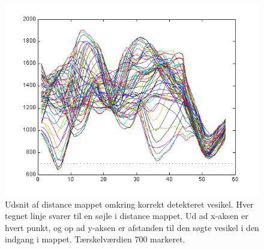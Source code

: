 \begin{figure}[H]
		\centering
		\includegraphics[scale=0.9]{files/postmethod/img/conv_lines_2.png}
	\caption{Udsnit af distance mappet omkring korrekt detekteret vesikel. Hver tegnet linje svarer til en søjle i distance mappet. Ud ad x-aksen er hvert punkt, og op ad y-aksen er afstanden til den søgte vesikel i den indgang i mappet. Tærskelværdien 700 markeret.\label{fig:postmethod_conv_lines_2}}
\end{figure}

